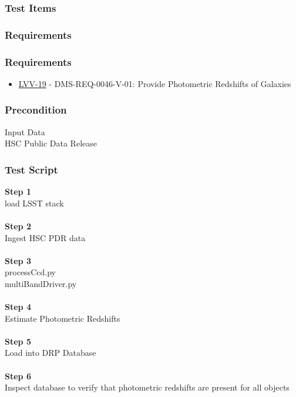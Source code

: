 \hypertarget{test-items-29}{%
\subsubsection{Test Items}\label{test-items-29}}

\hypertarget{requirements-58}{%
\subsubsection{Requirements}\label{requirements-58}}

\hypertarget{requirements-59}{%
\subsubsection{Requirements}\label{requirements-59}}

\begin{itemize}
\tightlist
\item
  \href{https://jira.lsstcorp.org/browse/LVV-19}{LVV-19} -
  DMS-REQ-0046-V-01: Provide Photometric Redshifts of Galaxies
\end{itemize}

\hypertarget{precondition-5}{%
\subsubsection{Precondition}\label{precondition-5}}

Input Data\\
HSC Public Data Release

\hypertarget{test-script-29}{%
\subsubsection{Test Script}\label{test-script-29}}

\textbf{Step 1}\\
load LSST stack\\
~\\
\textbf{Step 2}\\
Ingest HSC PDR data\\
~\\
\textbf{Step 3}\\
processCcd.py\\
multiBandDriver.py\\
~\\
\textbf{Step 4}\\
Estimate Photometric Redshifts\\
~\\
\textbf{Step 5}\\
Load into DRP Database\\
~\\
\textbf{Step 6}\\
Inspect database to verify that photometric redshifts are present for
all objects\\
~\\

